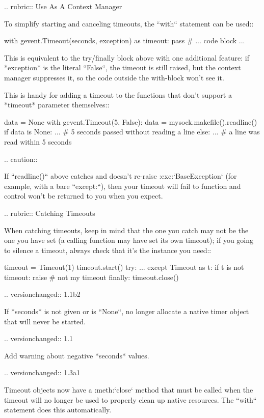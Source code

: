 \begin{DoxyVerb}
.. rubric:: Use As A Context Manager

To simplify starting and canceling timeouts, the ``with``
statement can be used::

    with gevent.Timeout(seconds, exception) as timeout:
        pass  # ... code block ...

This is equivalent to the try/finally block above with one
additional feature: if *exception* is the literal ``False``, the
timeout is still raised, but the context manager suppresses it, so
the code outside the with-block won't see it.

This is handy for adding a timeout to the functions that don't
support a *timeout* parameter themselves::

    data = None
    with gevent.Timeout(5, False):
        data = mysock.makefile().readline()
    if data is None:
        ...  # 5 seconds passed without reading a line
    else:
        ...  # a line was read within 5 seconds

.. caution::

    If ``readline()`` above catches and doesn't re-raise
    :exc:`BaseException` (for example, with a bare ``except:``), then
    your timeout will fail to function and control won't be returned
    to you when you expect.

.. rubric:: Catching Timeouts

When catching timeouts, keep in mind that the one you catch may
not be the one you have set (a calling function may have set its
own timeout); if you going to silence a timeout, always check that
it's the instance you need::

    timeout = Timeout(1)
    timeout.start()
    try:
        ...
    except Timeout as t:
        if t is not timeout:
            raise # not my timeout
    finally:
        timeout.close()


.. versionchanged:: 1.1b2

    If *seconds* is not given or is ``None``, no longer allocate a
    native timer object that will never be started.

.. versionchanged:: 1.1

    Add warning about negative *seconds* values.

.. versionchanged:: 1.3a1

    Timeout objects now have a :meth:`close`
    method that must be called when the timeout will no longer be
    used to properly clean up native resources.
    The ``with`` statement does this automatically.\end{DoxyVerb}
 

